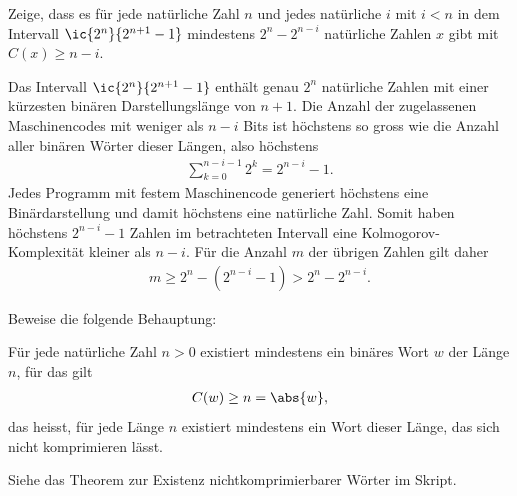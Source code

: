 \begin{questions}
	\question[1] Zeige, dass es für jede natürliche Zahl $n$ und jedes natürliche $i$ mit $i<n$ in dem Intervall $\ic{2^n}{2^{n+1} - 1}$ mindestens $2^n - 2^{n-i}$ natürliche Zahlen $x$ gibt mit $C(x) \geq n-i$.
	\begin{solution}
		Das Intervall $\ic{2^n}{2^{n+1} - 1}$ enthält genau $2^n$ natürliche Zahlen mit einer kürzesten binären Darstellungslänge von $n + 1$.
		Die Anzahl der zugelassenen Maschinencodes mit weniger als $n-i$ Bits ist höchstens so gross wie die Anzahl aller binären Wörter dieser Längen, also höchstens
		\begin{align*}
			\sum_{k=0}^{n-i-1}2^k=2^{n-i}-1.
		\end{align*}
		Jedes Programm mit festem Maschinencode generiert höchstens eine Binärdarstellung und damit höchstens eine natürliche Zahl. Somit haben höchstens $2^{n-i}-1$ Zahlen im betrachteten Intervall eine Kolmogorov-Komplexität kleiner als $n-i$. Für die Anzahl $m$ der übrigen Zahlen gilt daher
		\begin{align*}
			m\geq2^n-(2^{n-i}-1)>2^n-2^{n-i}.
		\end{align*}
	\end{solution}
	
	\question[2] Beweise die folgende Behauptung:
	\begin{center}
		Für jede natürliche Zahl $n>0$ existiert mindestens ein binäres Wort $w$ der Länge $n$, für das gilt
		\begin{align*}
			C(w)\geq n = \abs{w},
		\end{align*}
		das heisst, für jede Länge $n$ existiert mindestens ein Wort dieser Länge, das sich nicht komprimieren lässt.
	\end{center}
	\begin{solution}
		Siehe das Theorem zur Existenz nichtkomprimierbarer Wörter im Skript.
	\end{solution}
\end{questions}
